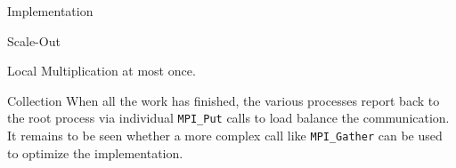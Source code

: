 \documentclass{article}
\begin{document}
\begin{section}{Implementation}
\begin{subsection}{Scale-Out}
\begin{paragraph}{Local Multiplication}
      at most once.
    \end{paragraph}
    \begin{paragraph}{Collection}
      When all the work has finished, the various processes report back to the root process via individual \texttt{MPI\_Put} calls to load balance
      the communication. It remains to be seen whether a more complex call like \texttt{MPI\_Gather} can be used to optimize the implementation.
    \end{paragraph}
    \begin{paragraph}
    \end{paragraph}
  \end{subsection}
\end{section}
\printbibliography
\end{document}
